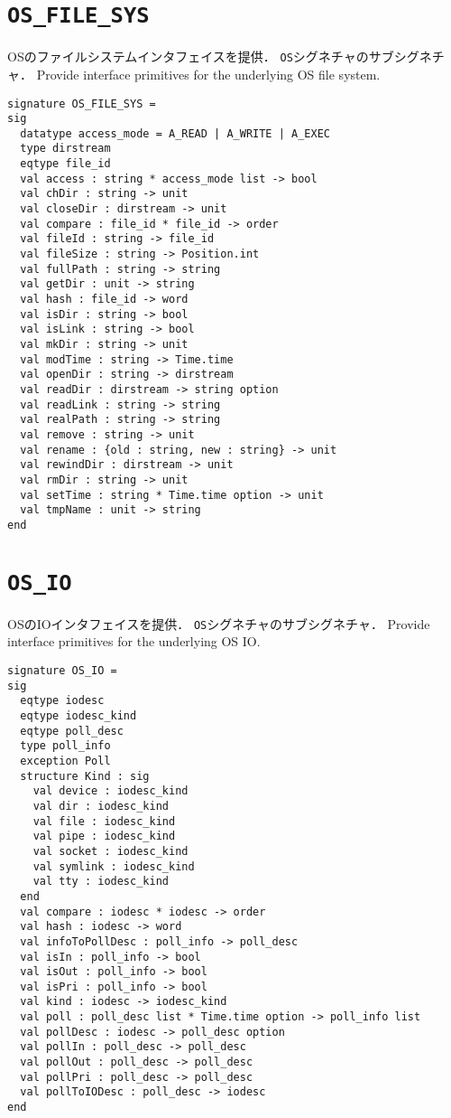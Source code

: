 \documentclass{jbook}
\newcommand{\code}[1]{\mbox{\large\tt #1}}
\newcommand{\signature}[2]{
\section{{\tt #1}}\label{section:reference:#2}
}
\begin{document}
\signature{OS\_FILE\_SYS}{OSFILESYS}
\ifjp%
	OSのファイルシステムインタフェイスを提供．
	\code{OS}シグネチャのサブシグネチャ．
\else%
	Provide interface primitives for the underlying OS file system.
\fi%

\begin{verbatim}
signature OS_FILE_SYS =
sig
  datatype access_mode = A_READ | A_WRITE | A_EXEC
  type dirstream
  eqtype file_id
  val access : string * access_mode list -> bool
  val chDir : string -> unit
  val closeDir : dirstream -> unit
  val compare : file_id * file_id -> order
  val fileId : string -> file_id
  val fileSize : string -> Position.int
  val fullPath : string -> string
  val getDir : unit -> string
  val hash : file_id -> word
  val isDir : string -> bool
  val isLink : string -> bool
  val mkDir : string -> unit
  val modTime : string -> Time.time
  val openDir : string -> dirstream
  val readDir : dirstream -> string option
  val readLink : string -> string
  val realPath : string -> string
  val remove : string -> unit
  val rename : {old : string, new : string} -> unit
  val rewindDir : dirstream -> unit
  val rmDir : string -> unit
  val setTime : string * Time.time option -> unit
  val tmpName : unit -> string
end
\end{verbatim}

\signature{OS\_IO}{OSIO}
\ifjp%
	OSのIOインタフェイスを提供．
	\code{OS}シグネチャのサブシグネチャ．
\else%
	Provide interface primitives for the underlying OS IO.
\fi%

\begin{verbatim}
signature OS_IO =
sig
  eqtype iodesc
  eqtype iodesc_kind
  eqtype poll_desc
  type poll_info
  exception Poll
  structure Kind : sig
    val device : iodesc_kind
    val dir : iodesc_kind
    val file : iodesc_kind
    val pipe : iodesc_kind
    val socket : iodesc_kind
    val symlink : iodesc_kind
    val tty : iodesc_kind
  end
  val compare : iodesc * iodesc -> order
  val hash : iodesc -> word
  val infoToPollDesc : poll_info -> poll_desc
  val isIn : poll_info -> bool
  val isOut : poll_info -> bool
  val isPri : poll_info -> bool
  val kind : iodesc -> iodesc_kind
  val poll : poll_desc list * Time.time option -> poll_info list
  val pollDesc : iodesc -> poll_desc option
  val pollIn : poll_desc -> poll_desc
  val pollOut : poll_desc -> poll_desc
  val pollPri : poll_desc -> poll_desc
  val pollToIODesc : poll_desc -> iodesc
end
\end{verbatim}
\end{document}
